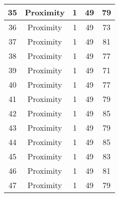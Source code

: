 \documentclass[results.tex]{subfiles}
\begin{document}
\begin{center}
\begin{tabular}{| c || c | c | c | c |}
            \hline
            35                      & Proximity                    & 1                      & 49                      & 79                   \\
            \hline
            36                      & Proximity                    & 1                      & 49                      & 73                   \\
            \hline
            37                      & Proximity                    & 1                      & 49                      & 81                   \\
            \hline
            38                      & Proximity                    & 1                      & 49                      & 77                   \\
            \hline
            39                      & Proximity                    & 1                      & 49                      & 71                   \\
            \hline
            40                      & Proximity                    & 1                      & 49                      & 77                   \\
            \hline
            41                      & Proximity                    & 1                      & 49                      & 79                   \\
            \hline
            42                      & Proximity                    & 1                      & 49                      & 85                   \\
            \hline
            43                      & Proximity                    & 1                      & 49                      & 79                   \\
            \hline
            44                      & Proximity                    & 1                      & 49                      & 85                   \\
            \hline
            45                      & Proximity                    & 1                      & 49                      & 83                   \\
            \hline
            46                      & Proximity                    & 1                      & 49                      & 81                   \\
            \hline
            47                      & Proximity                    & 1                      & 49                      & 79                   \\

\end{tabular}
\end{center}
\end{document}
